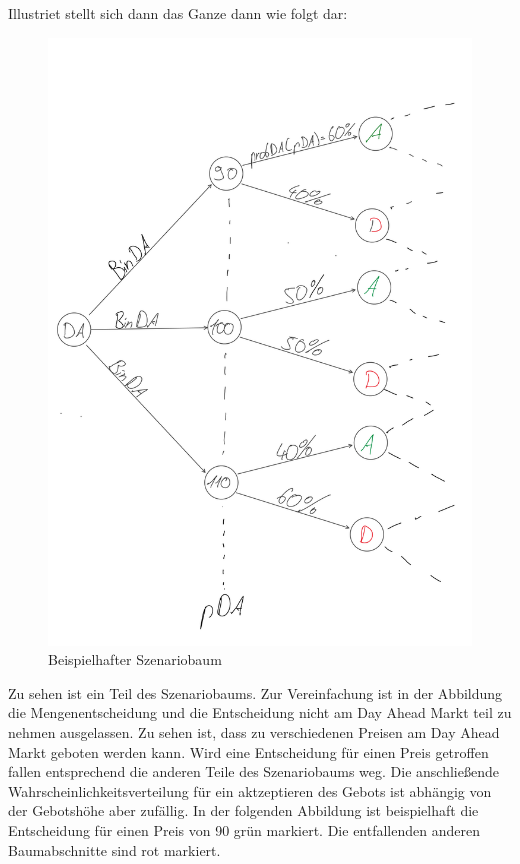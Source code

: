 Illustriet stellt sich dann das Ganze dann wie folgt dar:
\begin{figure}[H]
    \centering
    \includegraphics[width=1\linewidth]{pictures/szBaumBeispiel1.png}
    \caption{Beispielhafter Szenariobaum}
    \label{fig:enter-label}
\end{figure}
Zu sehen ist ein Teil des Szenariobaums. Zur Vereinfachung ist in der Abbildung die Mengenentscheidung und die Entscheidung nicht am Day Ahead Markt teil zu nehmen ausgelassen. Zu sehen ist, dass zu verschiedenen Preisen am Day Ahead Markt geboten werden kann. 
Wird eine Entscheidung für einen Preis getroffen fallen entsprechend die anderen Teile des Szenariobaums weg.
Die anschließende Wahrscheinlichkeitsverteilung für ein aktzeptieren des Gebots ist abhängig von der Gebotshöhe aber zufällig.
In der folgenden Abbildung ist beispielhaft die Entscheidung für einen Preis von 90 grün markiert. Die entfallenden anderen Baumabschnitte sind rot markiert.\\

